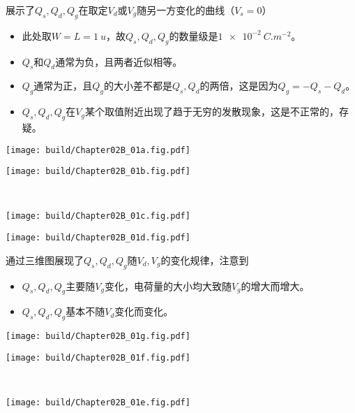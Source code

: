 展示了$Q_s,Q_d,Q_g$在取定$V_d$或$V_g$随另一方变化的曲线（$V_s=0$）
\begin{itemize}
    \item 此处取$W=L=\SI{1}{u}$，故$Q_s,Q_d,Q_g$的数量级是$\SI{1e-2}{C.m^{-2}}$。
    \item $Q_s$和$Q_d$通常为负，且两者近似相等。
    \item $Q_g$通常为正，且$Q_g$的大小差不都是$Q_s,Q_d$的两倍，这是因为$Q_g=-Q_s-Q_d$。
    \item $Q_s,Q_d,Q_g$在$V_g$某个取值附近出现了趋于无穷的发散现象，这是不正常的，存疑。
\end{itemize}
\begin{Figure}[电荷量的二维图]
    \begin{FigureSub}[取$V_d=\SI{0}{V}$;电荷Vd0]
        \texttt{[image: build/Chapter02B\_01a.fig.pdf]}
    \end{FigureSub}
    \begin{FigureSub}[取$V_d=\SI{1}{V}$;电荷Vd1]
        \texttt{[image: build/Chapter02B\_01b.fig.pdf]}
    \end{FigureSub}\\ \vspace{0.25cm}
    \begin{FigureSub}[取$V_g=\SI{0}{V}$;电荷Vg0]
        \texttt{[image: build/Chapter02B\_01c.fig.pdf]}
    \end{FigureSub}
    \begin{FigureSub}[取$V_g=\SI{1}{V}$;电荷Vg1]
        \texttt{[image: build/Chapter02B\_01d.fig.pdf]}
    \end{FigureSub}
\end{Figure}

通过三维图展现了$Q_s,Q_d,Q_g$随$V_d,V_g$的变化规律，注意到
\begin{itemize}
    \item $Q_s,Q_d,Q_g$主要随$V_g$变化，电荷量的大小均大致随$V_g$的增大而增大。
    \item $Q_s,Q_d,Q_g$基本不随$V_d$变化而变化。
\end{itemize}

\begin{Figure}[电荷量的三维图]
    \begin{FigureSub}[源端电荷]
        \texttt{[image: build/Chapter02B\_01g.fig.pdf]}
    \end{FigureSub}
    \begin{FigureSub}[漏端电荷]
        \texttt{[image: build/Chapter02B\_01f.fig.pdf]}
    \end{FigureSub}\\ \vspace{0.25cm}
    \begin{FigureSub}[栅端电荷]
        \texttt{[image: build/Chapter02B\_01e.fig.pdf]}
    \end{FigureSub}
\end{Figure}